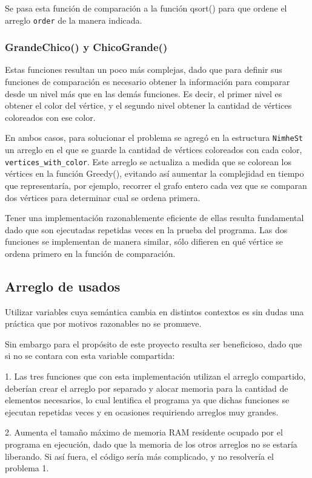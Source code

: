 \documentclass[11pt,a4paper]{article}
\theoremstyle{plain}
\begin{document}
Se pasa esta función de comparación a la función qsort() para que ordene el arreglo \texttt{order} de la manera indicada.

		\subsubsection{GrandeChico() y ChicoGrande()}
		\label{7.5.2}
	
Estas funciones resultan un poco más complejas, dado que para definir sus funciones de comparación es necesario obtener la información para comparar desde un nivel más que en las demás funciones. Es decir, el primer nivel es obtener el color del vértice, y el segundo nivel obtener la cantidad de vértices coloreados con ese color.

En ambos casos, para solucionar el problema se agregó en la estructura \texttt{NimheSt} un arreglo en el que se guarde la cantidad de vértices coloreados con cada color, \texttt{vertices\_with\_color}. Este arreglo se actualiza a medida que se colorean los vértices en la función Greedy(), evitando así aumentar la complejidad en tiempo que representaría, por ejemplo, recorrer el grafo entero cada vez que se comparan dos vértices para determinar cual se ordena primera.

Tener una implementación razonablemente eficiente de ellas resulta fundamental dado que son ejecutadas repetidas veces en la prueba del programa. Las dos funciones se implementan de manera similar, sólo difieren en qué vértice se ordena primero en la función de comparación.

	\subsection{Arreglo de usados}
	\label{sec:7.6}

Utilizar variables cuya semántica cambia en distintos contextos es sin dudas una práctica que por motivos razonables no se promueve. 

Sin embargo para el propósito de este proyecto resulta ser beneficioso, dado que si no se contara con esta variable compartida: 

1. Las tres funciones que con esta implementación utilizan el arreglo compartido, deberían crear el arreglo por separado y alocar memoria para la cantidad de elementos necesarios, lo cual lentifica el programa ya que dichas funciones se ejecutan repetidas veces y en ocasiones requiriendo arreglos muy grandes.

2. Aumenta el tamaño máximo de memoria RAM residente ocupado por el programa en ejecución, dado que la memoria de los otros arreglos no se estaría liberando. Si así fuera, el código sería más complicado, y no resolvería el problema 1.
\end{document}
